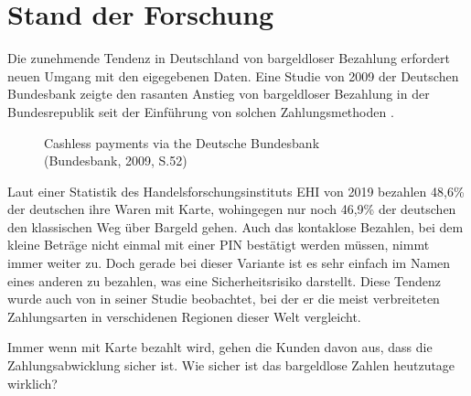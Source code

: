 \section{Stand der Forschung}


Die zunehmende Tendenz in Deutschland von bargeldloser Bezahlung erfordert neuen Umgang mit den 
eigegebenen Daten. Eine Studie von 2009 der Deutschen Bundesbank zeigte den rasanten Anstieg von 
bargeldloser Bezahlung in der Bundesrepublik seit der Einführung von solchen Zahlungsmethoden 
\cite{refrep:DBCP}.

\begin{figure}[htb]
    \caption{Cashless payments via the Deutsche Bundesbank\\ (Bundesbank, 2009, S.52)}
    \label{fig:refrep_DB}
\end{figure}


Laut einer Statistik des Handelsforschungsinstituts EHI von 2019 \cite{refart:KSDL} bezahlen 48,6\% 
der deutschen ihre Waren mit Karte, wohingegen nur noch 46,9\% der deutschen den klassischen 
Weg über Bargeld gehen. Auch das kontaklose Bezahlen, bei dem kleine Beträge nicht einmal mit einer 
PIN bestätigt werden müssen, nimmt immer weiter zu. Doch gerade bei dieser Variante ist es sehr einfach
im Namen eines anderen zu bezahlen, was eine Sicherheitsrisiko darstellt. Diese Tendenz wurde auch
von \cite{refart:TDMP} in seiner Studie beobachtet, bei der er die meist verbreiteten Zahlungsarten
in verschidenen Regionen dieser Welt vergleicht. 


Immer wenn mit Karte bezahlt wird, gehen die Kunden davon aus, dass die Zahlungsabwicklung sicher ist. 
Wie sicher ist das bargeldlose Zahlen heutzutage wirklich? 


